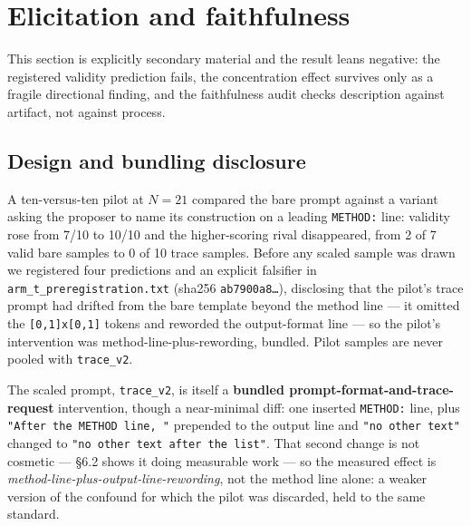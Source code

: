 \section{Elicitation and faithfulness}

This section is explicitly secondary material and the result leans negative: the registered
validity prediction fails, the concentration effect survives only as a fragile directional
finding, and the faithfulness audit checks description against artifact, not against process.

\subsection{Design and bundling disclosure}

A ten-versus-ten pilot at $N = 21$ compared the bare prompt against a variant asking the proposer to
name its construction on a leading \texttt{METHOD:} line: validity rose from 7/10 to 10/10 and the
higher-scoring rival disappeared, from 2 of 7 valid bare samples to 0 of 10 trace samples. Before
any scaled sample was drawn we registered four predictions and an explicit falsifier in
\texttt{arm\_t\_preregistration.txt} (sha256 \texttt{ab7900a8\ldots}), disclosing that the pilot's trace prompt had
drifted from the bare template beyond the method line --- it omitted the \texttt{[0,1]x[0,1]} tokens and
reworded the output-format line --- so the pilot's intervention was method-line-plus-rewording,
bundled. Pilot samples are never pooled with \texttt{trace\_v2}.

The scaled prompt, \texttt{trace\_v2}, is itself a \textbf{bundled prompt-format-and-trace-request}
intervention, though a near-minimal diff: one inserted \texttt{METHOD:} line, plus \texttt{"After the METHOD
line, "} prepended to the output line and \texttt{"no other text"} changed to \texttt{"no other text after the
list"}. That second change is not cosmetic --- \S6.2 shows it doing measurable work --- so the measured
effect is \emph{method-line-plus-output-line-rewording}, not the method line alone: a weaker version of
the confound for which the pilot was discarded, held to the same standard.

